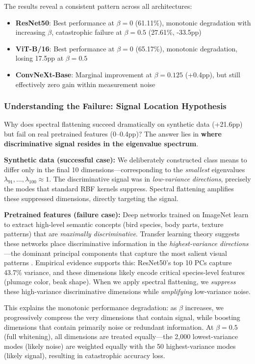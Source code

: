 \documentclass[11pt]{article}
\begin{document}
The results reveal a consistent pattern across all architectures:
\begin{itemize}
    \item \textbf{ResNet50}: Best performance at $\beta=0$ (61.11\%), monotonic degradation with increasing $\beta$, catastrophic failure at $\beta=0.5$ (27.61\%, -33.5pp)
    \item \textbf{ViT-B/16}: Best performance at $\beta=0$ (65.17\%), monotonic degradation, losing 17.5pp at $\beta=0.5$
    \item \textbf{ConvNeXt-Base}: Marginal improvement at $\beta=0.125$ (+0.4pp), but still effectively zero gain within measurement noise
\end{itemize}

\subsubsection{Understanding the Failure: Signal Location Hypothesis}

Why does spectral flattening succeed dramatically on synthetic data (+21.6pp) but fail on real pretrained features (0--0.4pp)? The answer lies in \textbf{where discriminative signal resides in the eigenvalue spectrum}.

\textbf{Synthetic data (successful case):} We deliberately constructed class means to differ only in the final 10 dimensions---corresponding to the \emph{smallest} eigenvalues $\lambda_{91}, \ldots, \lambda_{100} \approx 1$. The discriminative signal was in \emph{low-variance directions}, precisely the modes that standard RBF kernels suppress. Spectral flattening amplifies these suppressed dimensions, directly targeting the signal.

\textbf{Pretrained features (failure case):} Deep networks trained on ImageNet learn to extract high-level semantic concepts (bird species, body parts, texture patterns) that are \emph{maximally discriminative}. Transfer learning theory suggests these networks place discriminative information in the \emph{highest-variance directions}---the dominant principal components that capture the most salient visual patterns \cite{raghu2019transfusion}. Empirical evidence supports this: ResNet50's top 10 PCs capture 43.7\% variance, and these dimensions likely encode critical species-level features (plumage color, beak shape). When we apply spectral flattening, we \emph{suppress} these high-variance discriminative dimensions while \emph{amplifying} low-variance noise.

This explains the monotonic performance degradation: as $\beta$ increases, we progressively compress the very dimensions that contain signal, while boosting dimensions that contain primarily noise or redundant information. At $\beta=0.5$ (full whitening), all dimensions are treated equally---the 2,000 lowest-variance modes (likely noise) are weighted equally with the 50 highest-variance modes (likely signal), resulting in catastrophic accuracy loss.
\end{document}
